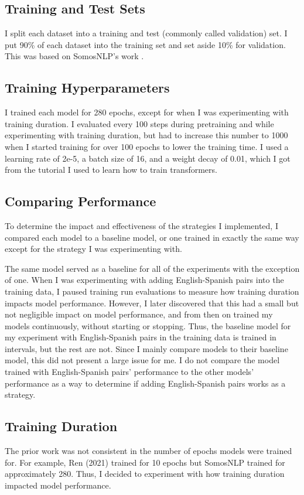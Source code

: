 \documentclass[10pt,twocolumn]{article}
\begin{document}
\subsection{Training and Test Sets}
I split each dataset into a training and test (commonly called validation) set. I put 90\% of each dataset into the training set and set aside 10\% for validation. This was based on SomosNLP's  work \cite{somosNLP} .

\subsection{Training Hyperparameters}
I trained each model for 280 epochs, except for when I was experimenting with training duration. I evaluated every 100 steps during pretraining and while experimenting with training duration, but had to increase this number to 1000 when I started training for over 100 epochs to lower the training time. I used a learning rate of 2e-5, a batch size of 16, and a weight decay of 0.01, which I got from the tutorial I used to learn how to train transformers. \cite{HuggingFaceTutorial}

\subsection{Comparing Performance}
To determine the impact and effectiveness of the strategies I implemented, I compared each model to a baseline model, or one trained in exactly the same way except for the strategy I was experimenting with. 

The same model served as a baseline for all of the experiments with the exception of one. When I was experimenting with adding English-Spanish pairs into the training data, I paused training run evaluations to measure how training duration impacts model performance. However, I later discovered that this had a small but not negligible impact on model performance, and from then on trained my models continuously, without starting or stopping. Thus, the baseline model for my experiment with English-Spanish pairs in the training data is trained in intervals, but the rest are not. Since I mainly compare models to their baseline model, this did not present a large issue for me. I do not compare the model trained with English-Spanish pairs' performance to the other models' performance as a way to determine if adding English-Spanish pairs works as a strategy. 


\subsection{Training Duration}
The prior work was not consistent in the number of epochs models were trained for. For example, Ren (2021) \cite{Ren} trained for 10 epochs but SomosNLP \cite{SomosNLP} trained for approximately 280. Thus, I decided to experiment with how training duration impacted model performance. 
\end{document}
